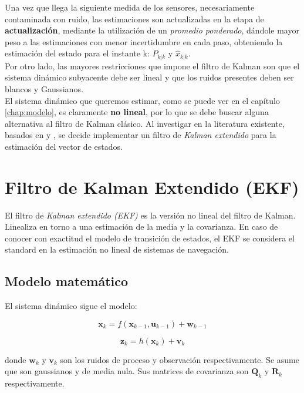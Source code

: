 \documentclass[main]{subfiles}
\begin{document}
Una vez que llega la siguiente medida de los sensores, necesariamente contaminada con ruido, las estimaciones son actualizadas en la etapa de \textbf{actualización}, mediante la utilización de un \emph{promedio ponderado}, dándole mayor peso a las estimaciones con menor incertidumbre en cada paso, obteniendo la estimación del estado para el instante k: $P_{k|k}$ y $\hat{x}_{k|k}$.\\

Por otro lado, las mayores restricciones que impone el filtro de Kalman son que el sistema dinámico subyacente debe ser lineal y que los ruidos presentes deben ser blancos y Gaussianos.\\

El sistema dinámico que queremos estimar, como se puede ver en el capítulo \ref{chap:modelo}, es claramente \textbf{no lineal}, por lo que se debe buscar alguna alternativa al filtro de Kalman clásico. Al investigar en la literatura existente, basados en \cite{bib:kalman} y \cite{bib:kalman2}, se decide implementar un filtro de \emph{Kalman extendido} para la estimación del vector de estados.

\section{Filtro de Kalman Extendido (EKF)}

El filtro de \emph{Kalman extendido (EKF)} es la versión no lineal del filtro de Kalman. Linealiza en torno a una estimación de la media y la covarianza. En caso de conocer con exactitud el modelo de transición de estados, el EKF se considera el standard en la estimación no lineal de sistemas de navegación.\\

\subsection{Modelo matemático}

El sistema dinámico sigue el modelo:

$$\mathbf{x}_{k} = f(\mathbf{x}_{k-1}, \mathbf{u}_{k-1}) + \mathbf{w}_{k-1}$$

$$\mathbf{z}_{k} = h(\mathbf{x}_{k}) + \mathbf{v}_{k}$$

donde $\mathbf{w}_k$ y $\mathbf{v}_k$ son los ruidos de proceso y observación respectivamente. Se asume que son gaussianos y de media nula. Sus matrices de covarianza son $\mathbf{Q}_k$ y $\mathbf{R}_k$ respectivamente.
\end{document}
